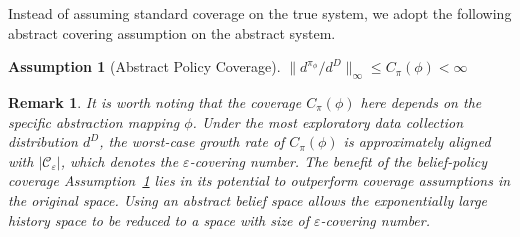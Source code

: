 \documentclass[twoside]{article}
\newtheorem{assumption}{Assumption}
\newtheorem{remark}{Remark}
\DeclareMathOperator*{\argmin}{arg\,min}
\newcommand{\zyh}[1]{{\color{blue}{ [\textbf{Youheng:}} #1]}}
\begin{document}

    
    Instead of assuming standard coverage on the true system, we adopt the following abstract covering assumption on the abstract system.
    \begin{assumption}[Abstract Policy Coverage]\label{asm:belief_policy_coverage}
        $\|d^{\pi_\phi}/d^{{D}}\|_\infty\leq C_\pi(\phi)<\infty$
    \end{assumption}
    \begin{remark}\label{remark:discuss_coverage_dbsp}
It is worth noting that the coverage $C_\pi(\phi)$ here depends on the specific abstraction mapping $\phi$. Under the most exploratory data collection distribution $d^{D}$, the worst-case growth rate of $C_\pi(\phi)$ is approximately aligned with $|\mathcal{C}_\varepsilon|$, which denotes the $\varepsilon$-covering number.
The benefit of the belief-policy coverage Assumption~\ref{asm:belief_policy_coverage} lies in its potential to outperform coverage assumptions in the original space. Using an abstract belief space allows the exponentially large history space to be reduced to a space with size of $\varepsilon$-covering number.
\end{remark}
\end{document}
